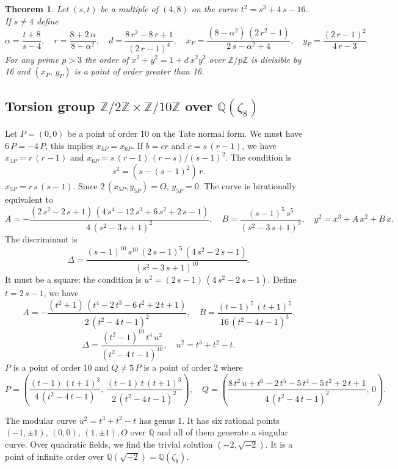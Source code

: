 \documentclass[a4paper, 11pt, pdftex]{report}
\theoremstyle{plain}
\newtheorem{theorem}{Theorem}[chapter]
\theoremstyle{definition}
\begin{document}
\begin{theorem}
Let $(s, t)$ be a multiple of $(4, 8)$ on the curve $t^2 = s^3 + 4\,s - 16$. If
$s \neq 4$  define
$$\alpha = \frac{t + 8}{s - 4},\quad r = \frac{8 + 2\,\alpha}{8 - \alpha^2},\quad
d = \frac{8\,r^2 - 8\,r + 1}{(2\,r - 1)^4},\quad
x_P = \frac{(8 - \alpha^2)\,(2\,r^2 - 1)}{2\,s - \alpha^2 + 4},\quad
y_P = \frac{(2\,r - 1)^2}{4\,r - 3}.$$
For any prime $p > 3$ the order of $x^2 + y^2 = 1 + d\,x^2y^2$ over $\mathbb{Z}/p\mathbb{Z}$
is divisible by 16 and $(x_P,\,y_P)$ is a point of order greater than 16.
\end{theorem}

\subsection{Torsion group $\mathbb{Z}/2\mathbb{Z} \times \mathbb{Z}/10\mathbb{Z}$ over $\mathbb{Q}(\zeta_8)$}

Let $P = (0, 0)$ be a point of order 10 on the Tate normal form. We must have $6\,P = -4\,P$,
this implies $x_{4P} = x_{6P}$. If $b = cr$ and $c = s\,(r - 1)$,
we have $x_{4P} = r\,(r - 1)$ and $x_{6P} = s\,(r - 1)\,(r - s) / (s - 1)^2$.
The condition is
$$s^2 = (s - (s - 1)^2)\,r.$$
$x_{5P} = r\,s\,(s - 1)$. Since $2\,(x_{5P}, y_{5P}) = O$, $y_{5P} = 0$. The curve is 
birationally equivalent to
$$A = -\frac{(2\,s^2 - 2\,s + 1)\,(4\,s^4 - 12\,s^3 + 6\,s^2 + 2\,s - 1)}{4\,(s^2 - 3\,s + 1)^2},\quad
B = \frac{(s - 1)^5\, s^5}{(s^2 - 3\,s + 1)^3},\quad y^2 = x^3 + A\,x^2 + B\,x.$$
The discriminant is
$$\Delta = \frac{(s-1)^{10}\,s^{10}\,(2\,s - 1)^5\,(4\,s^2 - 2\,s - 1)}{(s^2 - 3\,s + 1)^{10}}.$$
It must be a square: the condition is $u^2 = (2\,s - 1)\,(4\,s^2 - 2\,s - 1)$.
Define $t = 2\,s - 1$, we have
$$A = -\frac{(t^2 + 1)\,(t^4 - 2\,t^3 - 6 \,t^2 + 2\,t + 1)}{2\,(t^2 - 4\,t - 1)^2},\quad
B = \frac{(t - 1)^5\,(t + 1)^5}{16\,(t^2 - 4\,t - 1)^3}.$$
$$\Delta = \frac{(t^2 - 1)^{10}\,t^4\,u^2}{(t^2 - 4\,t - 1)^{10}},\quad
u^2 = t^3 + t^2 - t.$$
$P$ is a point of order 10 and $Q \neq 5\,P$ is a point of order 2 where
$$P = \left(\frac{(t - 1)\,(t + 1)^3}{4\,(t^2 - 4\,t - 1)},\,
            \frac{(t - 1)\,t\,(t + 1)^3}{2\,(t^2 - 4\,t - 1)^2}\right),\quad
  Q = \left(\frac{8\,t^2\,u + t^6 - 2\,t^5 - 5\,t^4 - 5\,t^2 + 2\,t + 1}
                 {4\,(t^2 - 4\,t - 1)^2},\, 0\right).$$

The modular curve $u^2 = t^3 + t^2 - t$ has genus 1. It has six rational points
$(-1, \pm1)$, $(0, 0)$, $(1, \pm1), O$ over $\mathbb{Q}$ and all of them generate a singular curve.
Over quadratic fields, we find the trivial solution $(-2, \sqrt{-2})$. It is a point of
infinite order over $\mathbb{Q}(\sqrt{-2}) = \mathbb{Q}(\zeta_8)$.
\end{document}
